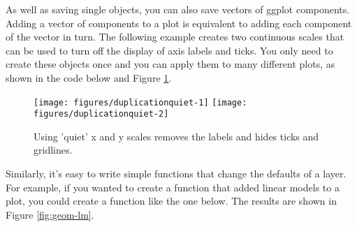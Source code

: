 As well as saving single objects, you can also save vectors of ggplot
components. Adding a vector of components to a plot is equivalent to
adding each component of the vector in turn. The following example
creates two continuous scales that can be used to turn off the display
of axis labels and ticks. You only need to create these objects once and
you can apply them to many different plots, as shown in the code below
and Figure \ref{fig:quiet}. 

\begin{Shaded}
\begin{Highlighting}[]
\StringTok{ }\NormalTok{(} \NormalTok{)}
\StringTok{ }\NormalTok{(} \NormalTok{)}

 \StringTok{ }
 \StringTok{ }\StringTok{ }
\end{Highlighting}
\end{Shaded}

\begin{figure}

{\centering \texttt{[image: figures/duplicationquiet-1]} \texttt{[image: figures/duplicationquiet-2]} 

}

\caption{Using 'quiet' x and y scales removes the labels and hides ticks and gridlines.\label{fig:quiet}}
\end{figure}

Similarly, it's easy to write simple functions that change the defaults
of a layer. For example, if you wanted to create a function that added
linear models to a plot, you could create a function like the one below.
The results are shown in Figure \ref{fig:geom-lm}.

\begin{Shaded}
\begin{Highlighting}[]
\StringTok{ } \StringTok{ }
  \NormalTok{(}  \NormalTok{, } \NormalTok{)}
\NormalTok{\}}
 \StringTok{ }\NormalTok{()}
\NormalTok{(}\NormalTok{)}
 \StringTok{ }\StringTok{ }\NormalTok{))}
\end{Highlighting}
\end{Shaded}

